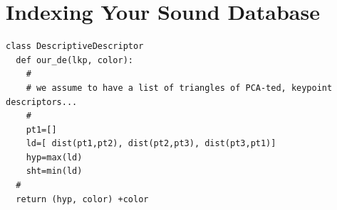 \documentclass{report}
\begin{document}
\section{Indexing Your Sound Database}
\begin{lstlisting}
class DescriptiveDescriptor
  def our_de(lkp, color):
    #
    # we assume to have a list of triangles of PCA-ted, keypoint descriptors...
    #
    pt1=[]
    ld=[ dist(pt1,pt2), dist(pt2,pt3), dist(pt3,pt1)]
    hyp=max(ld)
    sht=min(ld)
  #   
  return (hyp, color) +color

\end{lstlisting}
\end{document}
